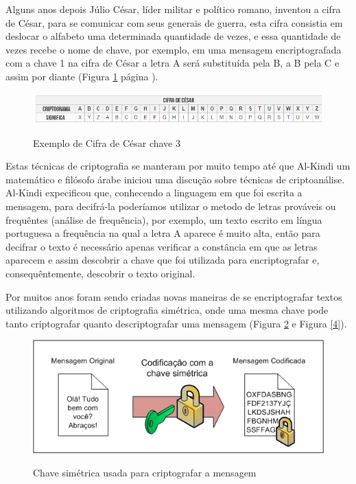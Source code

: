 \documentclass[12pt]{article}
\begin{document}
  Alguns anos depois J\'{u}lio C\'{e}sar, l\'{i}der militar e pol\'{i}tico romano, inventou a cifra de C\'{e}sar, para se comunicar com seus generais de guerra, esta cifra consistia em deslocar o alfabeto uma determinada quantidade de vezes, e essa quantidade de vezes recebe o nome de chave, por exemplo, em uma mensagem encriptografada com a chave 1 na cifra de C\'{e}sar a letra A ser\'{a} substitu\'{i}da pela B, a B pela C e assim por diante (Figura \ref{2} p\'{a}gina \pageref{2}).
  

\begin{figure}[!h]
\centering
\includegraphics[scale = .5]{cesar}
\caption{Exemplo de Cifra de C\'{e}sar chave 3}
\label{2}
\cite{gravity}
\end{figure}
 \pagebreak
Estas t\'{e}cnicas de criptografia se manteram por muito tempo at\'{e} que Al-Kindi um matem\'{a}tico e fil\'{o}sofo \'{a}rabe iniciou uma discu\c c\~{a}o sobre t\'{e}cnicas de criptoan\'{a}lise. Al-Kindi expecificou que, conhecendo a linguagem em que foi escrita a mensagem, para decifr\'{a}-la poder\'{i}amos utilizar o metodo de letras prov\'{a}veis ou frequ\^{e}ntes (an\'{a}lise de frequ\^{e}ncia), por exemplo, um texto escrito em l\'{i}ngua portuguesa a frequ\^{e}ncia na qual a letra A aparece \'{e} muito alta, ent\~{a}o para decifrar o texto \'{e} necess\'{a}rio apenas verificar a const\^{a}ncia em que as letras aparecem e assim descobrir a chave que foi utilizada para encriptografar e, consequ\^{e}ntemente, descobrir o texto original.

 Por muitos anos foram sendo criadas novas maneiras de se encriptografar textos utilizando algoritmos de criptografia sim\'{e}trica, onde uma mesma chave pode tanto criptografar quanto descriptografar uma mensagem (Figura \ref{3} e Figura \ref{4}).
\begin{figure}[!h]
\centering
\includegraphics[scale = .5]{simetrica1}
\caption{Chave sim\'{e}trica usada para criptografar a mensagem}
\label{3}
\cite{ufrj}
\end{figure}
\end{document}
